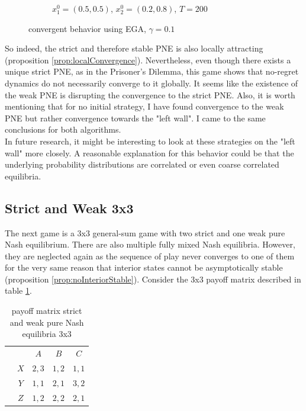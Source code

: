 \begin{figure}[ht]
\begin{subfigure}{.5\textwidth}
    \caption{$x_{1}^0 = (0.5,0.5)$, $x_{2}^0 = (0.2,0.8)$, $T = 200$}
    \label{fig:Weak3b}
\end{subfigure}
\caption{convergent behavior using EGA, $\gamma = 0.1$}
\label{fig:2x2Weak3}
\end{figure}

So indeed, the strict and therefore stable PNE is also locally attracting (proposition \ref{prop:localConvergence}). Nevertheless, even though there exists a unique strict PNE, as in the Prisoner's Dilemma, this game shows that no-regret dynamics do not necessarily converge to it globally. It seems like the existence of the weak PNE is disrupting the convergence to the strict PNE. Also, it is worth mentioning that for no initial strategy, I have found convergence to the weak PNE but rather convergence towards the "left wall". I came to the same conclusions for both algorithms. \\

In future research, it might be interesting to look at these strategies on the "left wall" more closely. A reasonable explanation for this behavior could be that the underlying probability distributions are correlated or even coarse correlated equilibria.


\subsection{Strict and Weak 3x3}\label{subsection:StrictAndWeak3x3}

The next game is a 3x3 general-sum game with two strict and one weak pure Nash equilibrium. There are also multiple fully mixed Nash equilibria. However, they are neglected again as the sequence of play never converges to one of them for the very same reason that interior states cannot be asymptotically stable (proposition \ref{prop:noInteriorStable}). Consider the 3x3 payoff matrix described in table \ref{tab:payoffStrictAndWeak3x3}. 

\begin{table}[H]\centering
\setlength{\extrarowheight}{2pt}
\begin{tabular}{cc|c|c|c|}
  & \multicolumn{1}{c}{} & \multicolumn{1}{c}{$A$}  & \multicolumn{1}{c}{$B$}  & \multicolumn{1}{c}{$C$} \\\cline{3-5}
            & $X$ & $2,3$ & $1,2$ & $1,1$ \\ \cline{3-5}
            & $Y$ & $1,1$ & $2,1$ & $3,2$ \\\cline{3-5}
            & $Z$ & $1,2$ & $2,2$ & $2,1$ \\\cline{3-5}
\end{tabular}\caption{\label{tab:payoffStrictAndWeak3x3}payoff matrix strict and weak pure Nash equilibria 3x3}
\end{table}

